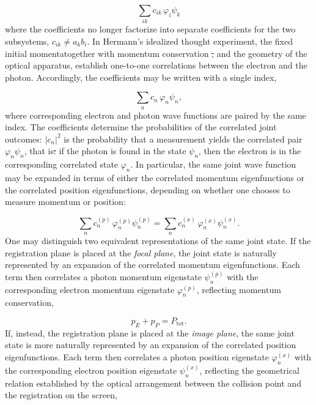 \documentclass[pdflatex]{sn-jnl}
\providecommand{\DIFadd}[1]{{\protect\color{blue}\uwave{#1}}} %
\providecommand{\DIFdel}[1]{{\protect\color{red}\sout{#1}}}                      %
\providecommand{\DIFaddbegin}{} %
\providecommand{\DIFaddend}{} %
\providecommand{\DIFdelbegin}{} %
\providecommand{\DIFdelend}{} %
\begin{document}
\begin{equation*}
\sum_{ik} c_{ik}\,\varphi_i\psi_k
\end{equation*}
%
where the coefficients no longer factorize into separate coefficients for the two subsystems, $c_{ik} \neq a_k b_i$. In Hermann's idealized thought experiment, the fixed initial momenta\DIFaddbegin \DIFadd{, }\DIFaddend together with momentum conservation \DIFdelbegin \DIFdel{, }\DIFdelend and the geometry of the optical apparatus, establish one-to-one correlations between the electron and the photon. Accordingly, the coefficients may be written with a single index,

\begin{equation*}
\sum_n c_n\,\varphi_n\psi_n ,
\end{equation*}
%
where corresponding electron and photon wave functions are paired by the same index. The coefficients determine the probabilities of the correlated joint outcomes: $|c_n|^2$ is the probability that a measurement yields the correlated pair $\varphi_n\psi_n$, that is\DIFdelbegin \DIFdel{: }\DIFdelend \DIFaddbegin \DIFadd{, }\DIFaddend if the photon is found in the state $\psi_n$, then the electron is in the corresponding correlated state $\varphi_n$. In particular, the same joint wave function may be expanded in terms of either the correlated momentum eigenfunctions or the correlated position eigenfunctions, depending on whether one chooses to measure momentum or position:

\begin{equation*}
\sum_n c_n^{(p)}\,
\varphi_n^{(p)}
\psi_n^{(p)}
=
\sum_n c_n^{(x)}\,
\varphi_n^{(x)}
\psi_n^{(x)}.
\end{equation*}
%
One may distinguish two equivalent representations of the same joint state. If the registration plane is placed at the \emph{focal plane}, the joint state is naturally represented by an expansion of the correlated momentum eigenfunctions. Each term then correlates a photon momentum eigenstate $\psi_n^{(p)}$ with the corresponding electron momentum eigenstate $\varphi_n^{(p)}$, reflecting momentum conservation,

\begin{equation*}
p_E+p_P=P_{\mathrm{tot}}.
\end{equation*}
%
If, instead, the registration plane is placed at the \emph{image plane}, the same joint state is more naturally represented by an expansion of the correlated position eigenfunctions. Each term then correlates a photon position eigenstate $\varphi_n^{(x)}$ with the corresponding electron position eigenstate $\psi_n^{(x)}$, reflecting the geometrical relation established by the optical arrangement between the collision point and the registration on the screen,
\end{document}
